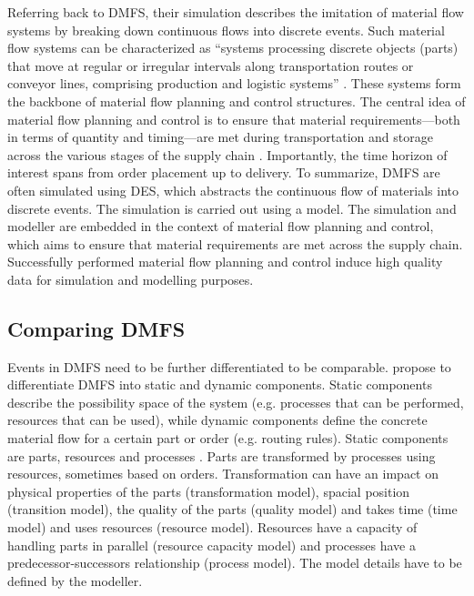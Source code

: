 Referring back to DMFS, their simulation describes the imitation of material flow systems by breaking down continuous flows into discrete events. Such material flow systems can be characterized as “systems processing discrete objects (parts) that move at regular or irregular intervals along transportation routes or conveyor lines, comprising production and logistic systems” \parencite{Arnold2006,schwede2024learning}. These systems form the backbone of material flow planning and control structures. The central idea of material flow planning and control is to ensure that material requirements—both in terms of quantity and timing—are met during transportation and storage across the various stages of the supply chain \autocite{Gehr2007}. Importantly, the time horizon of interest spans from order placement up to delivery.
To summarize, DMFS are often simulated using DES, which abstracts the continuous flow of materials into discrete events. The simulation is carried out using a model. The simulation and modeller are embedded in the context of material flow planning and control, which aims to ensure that material requirements are met across the supply chain. Successfully performed material flow planning and control induce high quality data for simulation and modelling purposes.

\subsection{Comparing DMFS}
Events in DMFS need to be further differentiated to be comparable. \Autocite{Arnold2006} propose to differentiate DMFS into static and dynamic components. Static components describe the possibility space of the system (e.g. processes that can be performed, resources that can be used), while dynamic components define the concrete material flow for a certain part or order (e.g. routing rules). Static components are parts, resources and processes \autocite{schwede2024learning}. Parts are transformed by processes using resources, sometimes based on orders. Transformation can have an impact on physical properties of the parts (transformation model), spacial position (transition model), the quality of the parts (quality model) and takes time (time model) and uses resources (resource model). Resources have a capacity of handling parts in parallel (resource capacity model) and processes have a predecessor-successors relationship (process model). The model details have to be defined by the modeller.


